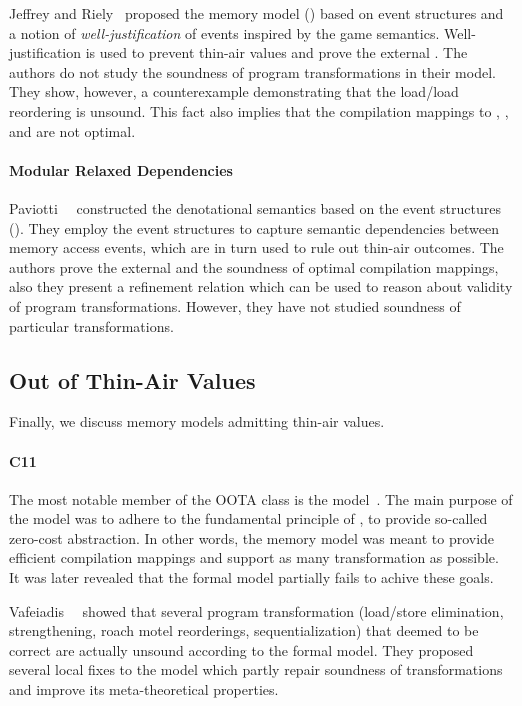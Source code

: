 Jeffrey and Riely~\cite{Jeffrey-Riely:LICS16} proposed 
the memory model (\WJES) based on event structures and a notion of 
\emph{well-justification} of events inspired by the game semantics. 
Well-justification is used to prevent thin-air values 
and prove the external \DRF. The authors do not study 
the soundness of program transformations in their model. 
They show, however, a counterexample demonstrating that 
the load/load reordering is unsound. 
This fact also implies that 
the compilation mappings to , , and \POWER 
are not optimal.   

\paragraph{Modular Relaxed Dependencies}

Paviotti~\etal~\cite{Paviotti-al:ESOP20} constructed the 
denotational semantics based on the event structures (\MRD). 
They employ the event structures to capture 
semantic dependencies between memory access events, 
which are in turn used to rule out thin-air outcomes.
The authors prove the external \DRF and 
the soundness of optimal compilation mappings,
also they present a refinement relation which 
can be used to reason about validity of program transformations. 
However, they have not studied soundness of particular transformations. 

\subsection{Out of Thin-Air Values}

Finally, we discuss memory models admitting thin-air values. 

\paragraph{C11}

The most notable member of the OOTA class is the \CMM model~\cite{Batty-al:POPL11}.
The main purpose of the \CMM model was to adhere to the fundamental principle of \CPP, 
\ie to provide so-called zero-cost abstraction. 
In other words, the memory model was meant to provide 
efficient compilation mappings and support as many transformation as possible.
It was later revealed that the formal model partially fails to achive these goals.

Vafeiadis~\etal~\cite{Vafeiadis-al:POPL15} showed that several program transformation 
(load/store elimination, strengthening, roach motel reorderings, sequentialization) 
that deemed to be correct are actually unsound according to the formal model.
They proposed several local fixes to the model which 
partly repair soundness of transformations and improve 
its meta-theoretical properties. 

